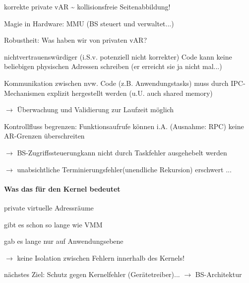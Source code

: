 \documentclass[a4paper]{article}
\newcommand{\cmark}{\ding{51}}
\begin{document}
\begin{multicols}{3}
    \begin{itemize*}
        \item
        korrekte private vAR \textasciitilde{} kollisionsfreie
        Seitenabbildung!
        \item
        Magie in Hardware: MMU (BS steuert und verwaltet...)
        \item
        Robustheit: Was haben wir von privaten vAR?
        \begin{itemize*}
            \item \cmark  nichtvertrauenswürdiger (i.S.v. potenziell nicht korrekter) Code kann keine beliebigen physischen Adressen schreiben (er erreicht sie ja nicht mal...)
            \item \cmark  Kommunikation zwischen nvw. Code (z.B. Anwendungstasks) muss durch IPC-Mechanismen explizit hergestellt werden (u.U. auch shared memory) \begin{itemize*} \item   $\rightarrow$  Überwachung und Validierung zur   Laufzeit möglich \end{itemize*}
            \item \cmark  Kontrollfluss begrenzen: Funktionsaufrufe können i.A. (Ausnahme: RPC) keine AR-Grenzen überschreiten \begin{itemize*} \item   $\rightarrow$  BS-Zugriffssteuerungkann nicht durch   Taskfehler ausgehebelt werden \item   $\rightarrow$  unabsichtliche   Terminierungsfehler(unendliche Rekursion) erschwert ... \end{itemize*}
        \end{itemize*}
    \end{itemize*}


    \paragraph{Was das für den Kernel
        bedeutet}

    \begin{itemize*}
        \item
        private virtuelle Adressräume
        \begin{itemize*}
            \item gibt es schon so lange wie VMM
            \item gab es lange nur auf Anwendungsebene
            \item $\rightarrow$  keine Isolation zwischen Fehlern innerhalb des Kernels!
        \end{itemize*}
        \item
        nächstes Ziel: Schutz gegen Kernelfehler (Gerätetreiber)...
        $\rightarrow$  BS-Architektur
    \end{itemize*}



\end{multicols}
\end{document}
